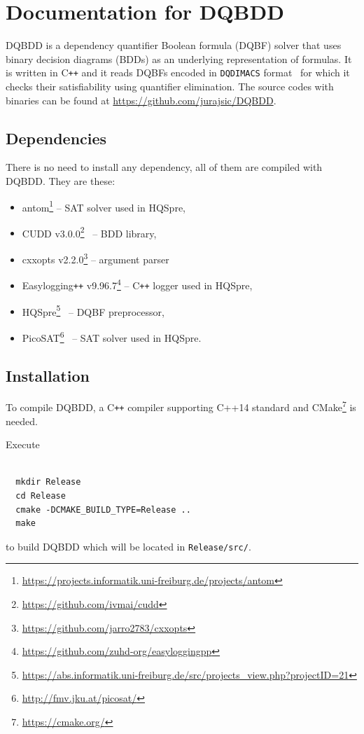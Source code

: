 \documentclass[
  digital, %
  color,
  twoside, %
  table,   %
  nolof,     %
  nolot,     %
]{fithesis3}
\theoremstyle{definition}
\theoremstyle{remark}
\newcommand{\DQDIMACS}[0]{\texttt{DQDIMACS}}
\newcommand{\Cplusplus}{C\texttt{++}}
\begin{document}
\chapter{Documentation for DQBDD}
\label{appendix:DQBDD}
DQBDD is a dependency quantifier Boolean formula (DQBF) solver that uses binary decision diagrams (BDDs) as an underlying representation of formulas. It is written in \Cplusplus{} and it reads DQBFs encoded in \DQDIMACS{} format~\cite{iDQandDQDIMACS} for which it checks their satisfiability using quantifier elimination. The source codes with binaries can be found at \url{https://github.com/jurajsic/DQBDD}. 


\section{Dependencies}
There is no need to install any dependency, all of them are compiled with DQBDD. They are these:
\begin{itemize}
  \item antom\footnote{\url{https://projects.informatik.uni-freiburg.de/projects/antom}} -- SAT solver used in HQSpre,
  \item CUDD v3.0.0\footnote{\url{https://github.com/ivmai/cudd}}~\cite{CUDD} -- BDD library,
  \item cxxopts v2.2.0\footnote{\url{https://github.com/jarro2783/cxxopts}} -- argument parser
  \item Easylogging\texttt{++} v9.96.7\footnote{\url{https://github.com/zuhd-org/easyloggingpp}} -- \Cplusplus{} logger used in HQSpre,
  \item HQSpre\footnote{\url{https://abs.informatik.uni-freiburg.de/src/projects_view.php?projectID=21}}~\cite{HQSpreJournal} -- DQBF preprocessor,
  \item PicoSAT\footnote{\url{http://fmv.jku.at/picosat/}}~\cite{PicoSAT} -- SAT solver used in HQSpre.
\end{itemize}

\section{Installation}
To compile DQBDD, a \Cplusplus{} compiler supporting C++14 standard and CMake\footnote{\url{https://cmake.org/}} is needed.

\newpage
\noindent Execute
\begin{verbatim}

  mkdir Release
  cd Release
  cmake -DCMAKE_BUILD_TYPE=Release ..
  make

\end{verbatim}
to build DQBDD which will be located in \verb|Release/src/|.
\end{document}
